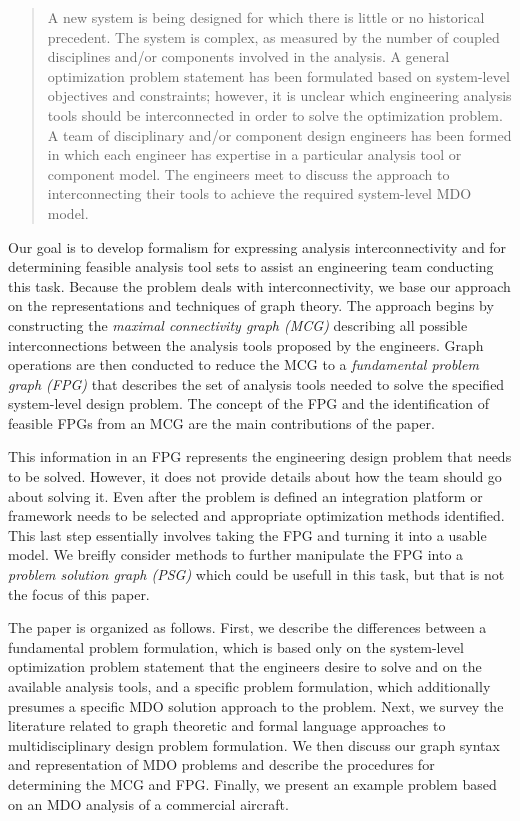     \begin{quote}
    A new system is being designed for which there is little or no historical precedent. The system
    is complex, as measured by the number of coupled disciplines and/or components involved in the
    analysis. A general optimization problem statement has been formulated based on system-level objectives and constraints; however, it is unclear which engineering analysis tools should
    be interconnected in order to solve the optimization problem. A team of disciplinary and/or component design engineers has been formed in which each engineer has expertise in a
    particular analysis tool or component model. The engineers meet to discuss the approach to
    interconnecting their tools to achieve the required system-level MDO model.
    \end{quote}

    Our goal is to develop formalism for expressing analysis interconnectivity and for determining feasible
    analysis tool sets to assist an engineering team conducting this task. Because the problem deals with
    interconnectivity, we base our approach on the representations and techniques of graph theory.
    The approach begins by constructing the \emph{maximal connectivity graph (MCG)} describing all possible
    interconnections between the analysis tools proposed by the engineers. Graph operations are then
    conducted to reduce the MCG to a \emph{fundamental problem graph (FPG)} that describes the set of analysis
    tools needed to solve the specified system-level design problem. The concept of the FPG and the identification of feasible FPGs from an MCG are the main contributions of the paper.

    This information in an FPG represents the engineering design problem that needs to be solved. 
    However, it does not provide details about how the team should go about 
    solving it. Even after the problem is defined an integration platform or framework needs 
    to be selected and appropriate optimization methods identified. This last step essentially 
    involves taking the FPG and turning it into a usable model. We breifly consider methods to further 
    manipulate the FPG into a \emph{problem solution graph (PSG)} which could be usefull in this 
    task, but that is not the focus of this paper. 
    
    The paper is organized as follows. First, we describe the differences between a fundamental problem
    formulation, which is based only on the system-level optimization problem statement that the
    engineers desire to solve and on the available analysis tools, and a specific problem formulation, which
    additionally presumes a specific MDO solution approach to the problem. Next, we survey the literature related to
    graph theoretic and formal language approaches to multidisciplinary design problem formulation. 
    We then discuss our graph syntax and representation of MDO problems and describe the procedures for 
    determining the MCG and FPG. Finally, we present an example problem based on an MDO analysis of a 
    commercial aircraft.

